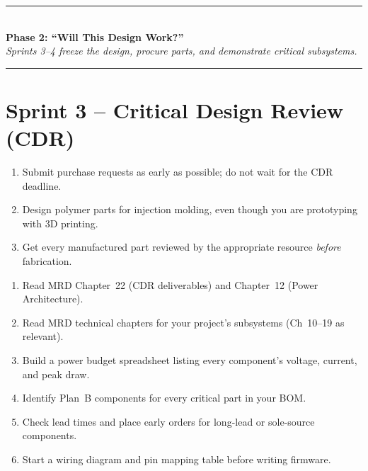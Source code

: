 \begin{center}
\textcolor{minesblue}{\rule{0.6\textwidth}{1pt}}\\[4pt]
{\Large\bfseries\sffamily\color{minesblue} Phase 2: ``Will This Design Work?''}\\[2pt]
{\small\itshape Sprints 3--4 freeze the design, procure parts, and demonstrate critical subsystems.}\\[4pt]
\textcolor{minesblue}{\rule{0.6\textwidth}{1pt}}
\end{center}
\vspace{0.5em}
\section{Sprint 3 -- Critical Design Review (CDR)}

\begin{priorities}
\begin{enumerate}[leftmargin=*, itemsep=1pt, topsep=0pt]
    \item Submit purchase requests as early as possible; do not wait for the CDR deadline.
    \item Design polymer parts for injection molding, even though you are prototyping with 3D printing.
    \item Get every manufactured part reviewed by the appropriate resource \textit{before} fabrication.
\end{enumerate}
\end{priorities}

\begin{checklistbox}
\begin{enumerate}[leftmargin=*, itemsep=1pt, topsep=0pt]
    \item Read MRD Chapter~22 (CDR deliverables) and Chapter~12 (Power Architecture).
    \item Read MRD technical chapters for your project's subsystems (Ch~10--19 as relevant).
    \item Build a power budget spreadsheet listing every component's voltage, current, and peak draw.
    \item Identify Plan~B components for every critical part in your BOM.
    \item Check lead times and place early orders for long-lead or sole-source components.
    \item Start a wiring diagram and pin mapping table before writing firmware.
\end{enumerate}
\end{checklistbox}

